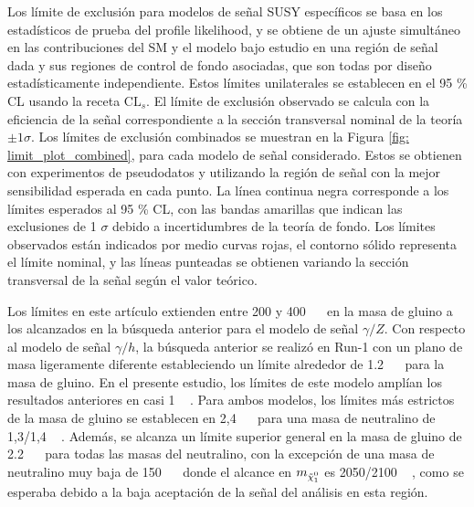 Los límite de exclusión para modelos de señal SUSY específicos se basa en los estadísticos de prueba del profile likelihood, y se obtiene de un ajuste simultáneo en las contribuciones del SM y el modelo bajo estudio en una región de señal dada y sus regiones de control de fondo asociadas, que son todas por diseño estadísticamente independiente. Estos límites unilaterales se establecen en el 95 \% CL usando la receta $\mathrm{CL}_s$.
El límite de exclusión observado se calcula con la eficiencia de la señal correspondiente a la sección transversal nominal de la teoría $\pm 1 \sigma$. Los límites de exclusión combinados se muestran en la Figura \ref{fig: limit_plot_combined}, para cada modelo de señal considerado. Estos se obtienen con experimentos de pseudodatos y utilizando la región de señal con la mejor sensibilidad esperada en cada punto.
La línea continua negra corresponde a los límites esperados al 95 \% CL, con las
bandas amarillas que indican las exclusiones de 1 $\sigma$ debido a
incertidumbres de la teoría de fondo. Los límites observados están indicados por medio
curvas rojas, el contorno sólido representa el límite nominal, y las líneas punteadas se obtienen variando la sección transversal de la señal según el valor teórico.

Los límites en este artículo extienden entre 200 y 400 ~ \gev\ en la masa de gluino a los alcanzados en la búsqueda anterior \cite{SUSY-2016-27} para el modelo de señal $\gamma/Z$. Con respecto al modelo de señal $\gamma/h$, la búsqueda anterior \cite{SUSY-2014-01} se realizó en Run-1 con un plano de masa ligeramente diferente estableciendo un límite alrededor de 1.2 ~ \tev\ para la masa de gluino. En el presente estudio, los límites de este modelo amplían los resultados anteriores en casi 1 ~ \tev.
Para ambos modelos, los límites más estrictos de la masa de gluino se establecen en 2,4 ~ \tev\ para una masa de neutralino de 1,3/1,4 ~ \tev. Además, se alcanza un límite superior general en la masa de gluino de 2.2 ~ \tev \, para todas las masas del neutralino, con la excepción de una masa de neutralino muy baja de 150 ~ \gev\ donde el alcance en $m_{\ninoone}$ es 2050/2100 ~ \gev, como se esperaba debido a la baja aceptación de la señal del análisis en esta región.


